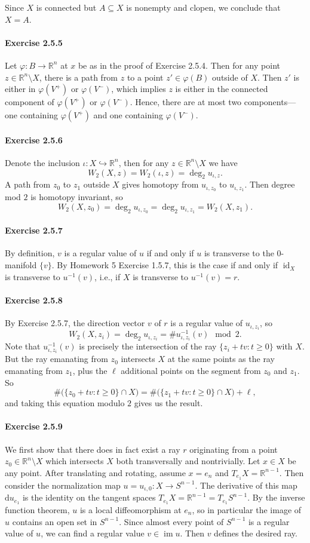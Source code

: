 \documentclass[12pt]{article}
\newcommand{\pnum}[1]{\paragraph{#1}}
\theoremstyle{definition}
\newcommand{\R}{\mathbb{R}}
\renewcommand{\phi}{\varphi}
\newcommand{\<}{\langle}
\renewcommand{\>}{\rangle}
\newcommand{\seq}{\subseteq}
\DeclareMathOperator{\id}{id}
\DeclareMathOperator{\im}{im}
\newcommand{\inc}{\hookrightarrow}
\newcommand{\dd}{\mathrm{d}}
\begin{document}
Since $X$ is connected but $A \seq X$ is nonempty and clopen, we conclude that $X = A$.

\pnum{Exercise 2.5.5}

Let $\phi : B \to \R^n$ at $x$ be as in the proof of Exercise 2.5.4.
Then for any point $z \in \R^n \setminus X$, there is a path from $z$ to a point $z' \in \phi(B)$ outside of $X$.
Then $z'$ is either in $\phi(V^+)$ or $\phi(V^-)$, which implies $z$ is either in the connected component of $\phi(V^+)$ or $\phi(V^-)$.
Hence, there are at most two components---one containing $\phi(V^+)$ and one containing $\phi(V^-)$.

\pnum{Exercise 2.5.6}

Denote the inclusion $\iota : X \inc \R^n$, then for any $z \in \R^n \setminus X$ we have
\[
    W_2(X, z) = W_2(\iota, z) = \deg_2 u_{\iota, z}.
\]
A path from $z_0$ to $z_1$ outside $X$ gives homotopy from $u_{\iota, z_0}$ to $u_{\iota, z_1}$.
Then degree mod $2$ is homotopy invariant, so
\[
    W_2(X, z_0) = \deg_2 u_{\iota, z_0} = \deg_2 u_{\iota, z_1} = W_2(X, z_1).
\]

\pnum{Exercise 2.5.7}

By definition, $v$ is a regular value of $u$ if and only if $u$ is transverse to the $0$-manifold $\{v\}$.
By Homework 5 Exercise 1.5.7, this is the case if and only if $\id_X$ is transverse to $u^{-1}(v)$, i.e., if $X$ is transverse to $u^{-1}(v) = r$.

\pnum{Exercise 2.5.8}

By Exercise 2.5.7, the direction vector $v$ of $r$ is a regular value of $u_{\iota, z_i}$, so
\[
    W_2(X, z_i)
        = \deg_2 u_{\iota, z_i}
        = \#u_{\iota, z_i}^{-1}(v) \mod{2}.
\]
Note that $u_{\iota, z_i}^{-1}(v)$ is precisely the intersection of the ray $\{z_i + tv : t \geq 0\}$ with $X$.
But the ray emanating from $z_0$ intersects $X$ at the same points as the ray emanating from $z_1$, plus the $\ell$ additional points on the segment from $z_0$ and $z_1$.
So
\[
    \#\big(\{z_0 + tv : t \geq 0\} \cap X\big) = \#\big(\{z_1 + tv : t \geq 0\} \cap X\big) + \ell,
\]
and taking this equation modulo $2$ gives us the result.


\pnum{Exercise 2.5.9}

We first show that there does in fact exist a ray $r$ originating from a point $z_0 \in \R^n \setminus X$ which intersects $X$ both transversally and nontrivially.
Let $x \in X$ be any point.
After translating and rotating, assume $x = e_n$ and $T_{e_1}X = \R^{n-1}$.
Then consider the normalization map $u = u_{\iota, 0} : X \to S^{n-1}$.
The derivative of this map $\dd{u}_{e_1}$ is the identity on the tangent spaces $T_{e_1}X = \R^{n-1} = T_{e_1}S^{n-1}$.
By the inverse function theorem, $u$ is a local diffeomorphism at $e_n$, so in particular the image of $u$ contains an open set in $S^{n-1}$.
Since almost every point of $S^{n-1}$ is a regular value of $u$, we can find a regular value $v \in \im u$.
Then $v$ defines the desired ray.
\end{document}
